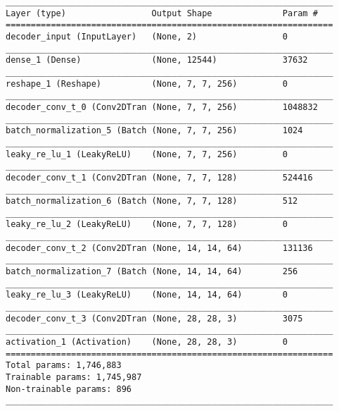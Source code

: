 \begin{lstlisting}[caption={\textsc{Mnist}-VAE Decoder},captionpos=b,basicstyle=\tiny, label={lst:mnist-vae-decoder}]
_________________________________________________________________
Layer (type)                 Output Shape              Param #
=================================================================
decoder_input (InputLayer)   (None, 2)                 0
_________________________________________________________________
dense_1 (Dense)              (None, 12544)             37632
_________________________________________________________________
reshape_1 (Reshape)          (None, 7, 7, 256)         0
_________________________________________________________________
decoder_conv_t_0 (Conv2DTran (None, 7, 7, 256)         1048832
_________________________________________________________________
batch_normalization_5 (Batch (None, 7, 7, 256)         1024
_________________________________________________________________
leaky_re_lu_1 (LeakyReLU)    (None, 7, 7, 256)         0
_________________________________________________________________
decoder_conv_t_1 (Conv2DTran (None, 7, 7, 128)         524416
_________________________________________________________________
batch_normalization_6 (Batch (None, 7, 7, 128)         512
_________________________________________________________________
leaky_re_lu_2 (LeakyReLU)    (None, 7, 7, 128)         0
_________________________________________________________________
decoder_conv_t_2 (Conv2DTran (None, 14, 14, 64)        131136
_________________________________________________________________
batch_normalization_7 (Batch (None, 14, 14, 64)        256
_________________________________________________________________
leaky_re_lu_3 (LeakyReLU)    (None, 14, 14, 64)        0
_________________________________________________________________
decoder_conv_t_3 (Conv2DTran (None, 28, 28, 3)         3075
_________________________________________________________________
activation_1 (Activation)    (None, 28, 28, 3)         0
=================================================================
Total params: 1,746,883
Trainable params: 1,745,987
Non-trainable params: 896
_________________________________________________________________
\end{lstlisting}